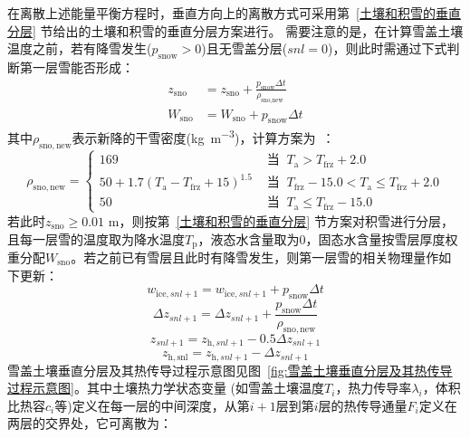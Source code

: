 在离散上述能量平衡方程时，垂直方向上的离散方式可采用第~\ref{土壤和积雪的垂直分层} 节给出的土壤和积雪的垂直分层方案进行。
需要注意的是，在计算雪盖土壤温度之前，若有降雪发生($p_{\mathrm {snow}} >0$)且无雪盖分层($snl=0$)，则此时需通过下式判断第一层雪能否形成：
\begin{equation}
  \begin{aligned}
    z_{\mathrm{sno}} &= z_{\mathrm{sno}}+\frac{p_{\mathrm{snow}} \Delta t}{\rho_{\text {sno,new }}} \\[1ex]
    W_{\mathrm{sno}} &= W_{\mathrm{sno}}+p_{\mathrm{snow}} \Delta t
  \end{aligned}
\end{equation}
其中$\rho_{\mathrm{sno,new}}$表示新降的干雪密度(\unit{kg.m^{-3}})，计算方案为~\citep{anderson1976point}：
\begin{equation}
  \rho_{\mathrm{sno, new}}=\begin{cases}
    169 & \text { 当 }\ T_{\mathrm{a}}>T_{\mathrm{frz}}+2.0 \\
    50+1.7\left(T_{\mathrm{a}}-T_{\mathrm{frz}}+15\right)^{1.5}  & \text { 当 }\ T_{\mathrm{frz}}-15.0<T_{\mathrm{a}} \leqslant T_{\mathrm{frz}}+2.0 \\
    50 & \text { 当 }\ T_{\mathrm{a}} \leqslant T_{\mathrm{frz}}-15.0
  \end{cases}
\end{equation}
若此时$z_{\mathrm{sno}} \geqslant 0.01$ \unit{m}，则按第~\ref{土壤和积雪的垂直分层} 节方案对积雪进行分层，且每一层雪的温度取为降水温度$T_{\mathrm {p}} $，液态水含量取为0，固态水含量按雪层厚度权重分配$W_{\mathrm{sno}}$。若之前已有雪层且此时有降雪发生，则第一层雪的相关物理量作如下更新：
\begin{equation}
  w_{\mathrm{ice},snl+1}=w_{\mathrm{ice},snl+1}+p_{\mathrm{snow}} \Delta t
\end{equation}
\begin{equation}
  \Delta z_{snl+1}=\Delta z_{snl+1}+\frac{p_{\mathrm{snow}} \Delta t}{\rho_{\mathrm{sno, new}}}
\end{equation}
\begin{equation}
  z_{snl+1}=z_{\mathrm{h},snl+1}-0.5 \Delta z_{snl+1}
\end{equation}
\begin{equation}
  z_{\mathrm{h, snl}}=z_{\mathrm{h},snl+1}-\Delta z_{snl+1}
\end{equation}
雪盖土壤垂直分层及其热传导过程示意图见图~\ref{fig:雪盖土壤垂直分层及其热传导过程示意图}。其中土壤热力学状态变量
(如雪盖土壤温度$T_{i} $，热力传导率$\lambda_i$，体积比热容$c_i$等)定义在每一层的中间深度，从第$i+1$层到第$i$层的热传导通量$F_i$定义在两层的交界处，它可离散为：
